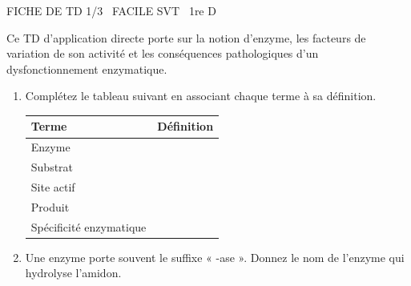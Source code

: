 \documentclass[11pt]{article}
\begin{document}
\begin{tcolorbox}[enhanced,colback=popink,colframe=popink,arc=10pt,boxrule=0pt,left=12pt,right=12pt,top=9pt,bottom=9pt]
{\color{white}\popxbold\small FICHE DE TD 1/3 \textbullet\ FACILE \hfill SVT \textbullet\ 1re D\par}
\end{tcolorbox}
\vspace{4pt}
\noindent Ce TD d'application directe porte sur la notion d'enzyme, les facteurs de variation de son activité et les conséquences pathologiques d'un dysfonctionnement enzymatique.

\begin{exercice}
\begin{enumerate}
    \item Complétez le tableau suivant en associant chaque terme à sa définition.
    \begin{tabular}{|p{3.5cm}|p{11cm}|}
    \hline
    \textbf{Terme} & \textbf{Définition} \\ \hline
    Enzyme &  \\ \hline
    Substrat &  \\ \hline
    Site actif &  \\ \hline
    Produit &  \\ \hline
    Spécificité enzymatique &  \\ \hline
    \end{tabular}
    \item Une enzyme porte souvent le suffixe « -ase ». Donnez le nom de l'enzyme qui hydrolyse l'amidon.
\end{enumerate}
\end{exercice}
\end{document}
